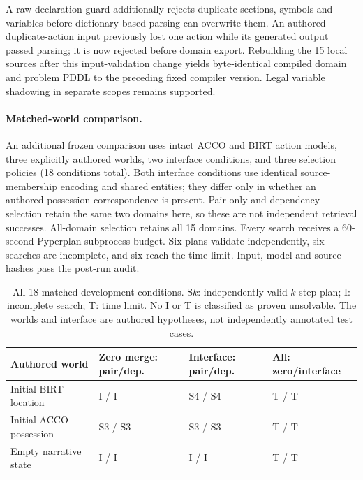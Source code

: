 \documentclass[letterpaper]{article}
\begin{document}
A raw-declaration guard additionally rejects duplicate sections, symbols and variables before dictionary-based parsing can overwrite them. An authored duplicate-action input previously lost one action while its generated output passed parsing; it is now rejected before domain export. Rebuilding the 15 local sources after this input-validation change yields byte-identical compiled domain and problem PDDL to the preceding fixed compiler version. Legal variable shadowing in separate scopes remains supported.

\paragraph{Matched-world comparison.}
An additional frozen comparison uses intact ACCO and BIRT action models, three explicitly authored worlds, two interface conditions, and three selection policies (18 conditions total). Both interface conditions use identical source-membership encoding and shared entities; they differ only in whether an authored possession correspondence is present. Pair-only and dependency selection retain the same two domains here, so these are not independent retrieval successes. All-domain selection retains all 15 domains. Every search receives a 60-second Pyperplan subprocess budget. Six plans validate independently, six searches are incomplete, and six reach the time limit. Input, model and source hashes pass the post-run audit.

\begin{table}[t]
\centering
\begin{tabular}{llll}
\toprule
Authored world & Zero merge: pair/dep. & Interface: pair/dep. & All: zero/interface\\
\midrule
Initial BIRT location & I / I & S4 / S4 & T / T\\
Initial ACCO possession & S3 / S3 & S3 / S3 & T / T\\
Empty narrative state & I / I & I / I & T / T\\
\bottomrule
\end{tabular}
\caption{All 18 matched development conditions. S$k$: independently valid $k$-step plan; I: incomplete search; T: time limit. No I or T is classified as proven unsolvable. The worlds and interface are authored hypotheses, not independently annotated test cases.}
\end{table}
\end{document}

